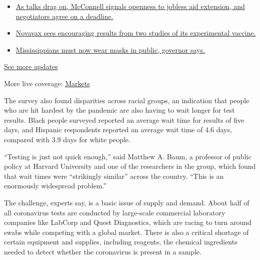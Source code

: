 \begin{itemize}
\tightlist
\item
  \href{https://www.nytimes.com/2020/08/04/world/coronavirus-cases.html?action=click\&pgtype=Article\&state=default\&region=MAIN_CONTENT_1\&context=storylines_live_updates\#link-762df92}{As
  talks drag on, McConnell signals openness to jobless aid extension,
  and negotiators agree on a deadline.}
\item
  \href{https://www.nytimes.com/2020/08/04/world/coronavirus-cases.html?action=click\&pgtype=Article\&state=default\&region=MAIN_CONTENT_1\&context=storylines_live_updates\#link-1228a480}{Novavax
  sees encouraging results from two studies of its experimental
  vaccine.}
\item
  \href{https://www.nytimes.com/2020/08/04/world/coronavirus-cases.html?action=click\&pgtype=Article\&state=default\&region=MAIN_CONTENT_1\&context=storylines_live_updates\#link-794484ed}{Mississippians
  must now wear masks in public, governor says.}
\end{itemize}

\href{https://www.nytimes.com/2020/08/04/world/coronavirus-cases.html?action=click\&pgtype=Article\&state=default\&region=MAIN_CONTENT_1\&context=storylines_live_updates}{See
more updates}

More live coverage:
\href{https://www.nytimes.com/live/2020/08/04/business/stock-market-today-coronavirus?action=click\&pgtype=Article\&state=default\&region=MAIN_CONTENT_1\&context=storylines_live_updates}{Markets}

The survey also found disparities across racial groups, an indication
that people who are hit hardest by the pandemic are also having to wait
longer for test results. Black people surveyed reported an average wait
time for results of five days, and Hispanic respondents reported an
average wait time of 4.6 days, compared with 3.9 days for white people.

``Testing is just not quick enough,'' said Matthew A. Baum, a professor
of public policy at Harvard University and one of the researchers in the
group, which found that wait times were ``strikingly similar'' across
the country. ``This is an enormously widespread problem.''

The challenge, experts say, is a basic issue of supply and demand. About
half of all coronavirus tests are conducted by large-scale commercial
laboratory companies like LabCorp and Quest Diagnostics, which are
racing to turn around swabs while competing with a global market. There
is also a critical shortage of certain equipment and supplies, including
reagents, the chemical ingredients needed to detect whether the
coronavirus is present in a sample.

